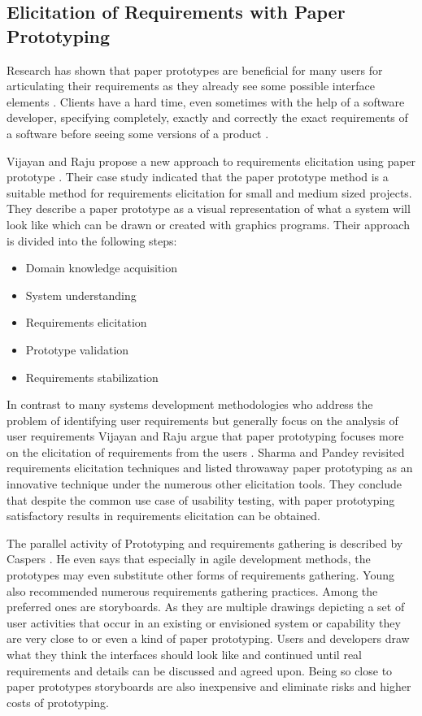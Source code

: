 \subsection{Elicitation of Requirements with Paper Prototyping}
\label{section:paperprototyping}
 
 Research has shown that paper prototypes are beneficial for many users for articulating their requirements as they already see some possible interface elements \cite{vijayan2011new}. Clients have a hard time, even sometimes with the help of a software developer, specifying completely, exactly and correctly the exact requirements of a software before seeing some versions of a product \cite{hickey1998prototyping}.

Vijayan and Raju propose a new approach to requirements elicitation using paper prototype \cite{vijayan2011new}. Their case study indicated that the paper prototype method is a suitable method for requirements elicitation for small and medium sized projects. They describe a paper prototype as a visual representation of what a system will look like which can be drawn or created with graphics programs. Their approach is divided into the following steps:
\begin{itemize}
	\item Domain knowledge acquisition
	\item System understanding
	\item Requirements elicitation
	\item Prototype validation
	\item Requirements stabilization
\end{itemize}

In contrast to many systems development methodologies who address the problem of identifying user requirements but generally focus on the analysis of user requirements Vijayan and Raju argue that paper prototyping focuses more on the elicitation of requirements from the users \cite{vijayan2011new}. Sharma and Pandey \cite{sharma2013revisiting} revisited requirements elicitation techniques and listed throwaway paper prototyping as an innovative technique under the numerous other elicitation tools. They conclude that despite the common use case of usability testing, with paper prototyping satisfactory results in requirements elicitation can be obtained.

The parallel activity of Prototyping and requirements gathering is described by Caspers \cite{jones1998estimating}. He even says that especially in agile development methods, the prototypes may even substitute other forms of requirements gathering. Young \cite{young2002recommended} also recommended numerous requirements gathering practices. Among the preferred ones are storyboards. As they are multiple drawings depicting a set of user activities that occur in an existing or envisioned system or capability they are very close to or even a kind of paper prototyping. Users and developers draw what they think the interfaces should look like and continued until real requirements and details can be discussed and agreed upon. Being so close to paper prototypes storyboards are also inexpensive and eliminate risks and higher costs of prototyping.

